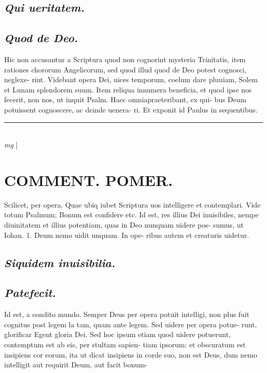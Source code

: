 \documentclass{article}
\begin{document}
\begin{pages}
\subsection*{\textit{Qui ueritatem. }}
{}
\subsection*{\textit{Quod de Deo. }}\pstart Hic non accusantur a Scriptura quod non cognorint mysteria Trinitatis, item rationes chororum Angelicorum, sed quod illud quod de Deo potest cognosci, neglexe- rint. Videbant opera Dei, uices temporum, coelum dare pluuiam, Solem et Lunam splendorem suum. Item reliqua innumera beneficia, et quod ipse nos fecerit, non nos, ut inquit Psalm. Haec omniapraeteribant, ex qui- bus Deum potuissent cognoscere, ac deinde uenera- ri. Et exponit id Paulus in sequentibus.   \pend
\vspace{0.5cm}\noindent
\vspace{0.2cm}\rule{1cm}{0.2pt}\\ 
\hspace{0.2cm}\textit{mg}
\footnotesize 
\normalsize| 
\section*{COMMENT. POMER.  }\pstart Scilicet, per opera. Quae ubiq iubet Scriptura uos intelligere et contemplari. Vide totum Psalmum; Bonum est confidere etc.  \pend\pstart Id est, res illius Dei inuisibiles, nempe diuinitatem et illius potentiam, quas in Deo nunquam uidere pos- sumus, ut Iohan. 1. Deum nemo uidit unquam. In ope- ribus autem et creaturis uidetur.   \pend
{}
{}
\subsection*{\textit{Siquidem inuisibilia. }}
{}
\subsection*{\textit{Patefecit. }}\pstart Id est, a condito mundo. Semper Deus per opera potuit intelligi, non plus fuit cognitus post legem la tam, quam ante legem. Sed uidere per opera potue- runt, glorificar Egent gloria Dei. Sed hoc ipsum etiam quod uidere potuerunt, contemptum est ab eis, per stultam sapien- tiam ipsorum: et obscuratum est insipiens cor eorum, ita ut dicat insipiens in corde suo, non est Deus, dum nemo intelligit aut requirit Deum, aut facit bonum-  \pend
{}
{}

\end{pages}
\end{document}
